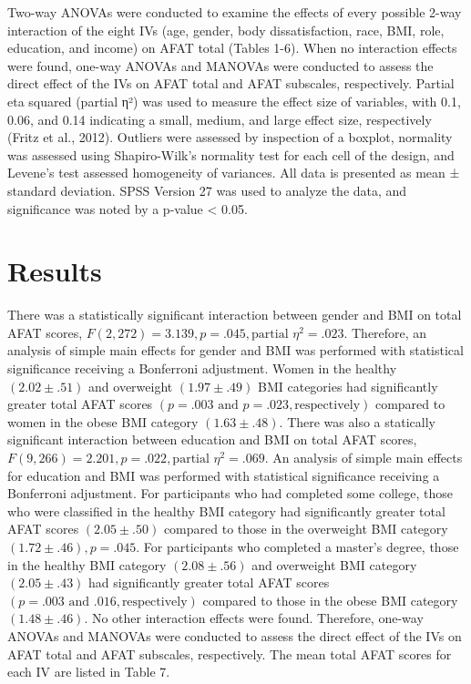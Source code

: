\documentclass[
  jou,
  longtable,
  nolmodern,
  notxfonts,
  notimes,
  colorlinks=true,linkcolor=blue,citecolor=blue,urlcolor=blue]{apa7}
\begin{document}
Two-way ANOVAs were conducted to examine the effects of every possible
2-way interaction of the eight IVs (age, gender, body dissatisfaction,
race, BMI, role, education, and income) on AFAT total (Tables 1-6). When
no interaction effects were found, one-way ANOVAs and MANOVAs were
conducted to assess the direct effect of the IVs on AFAT total and AFAT
subscales, respectively. Partial eta squared (partial η²) was used to
measure the effect size of variables, with 0.1, 0.06, and 0.14
indicating a small, medium, and large effect size, respectively (Fritz
et al., 2012). Outliers were assessed by inspection of a boxplot,
normality was assessed using Shapiro-Wilk's normality test for each cell
of the design, and Levene's test assessed homogeneity of variances. All
data is presented as mean ± standard deviation. SPSS Version 27 was used
to analyze the data, and significance was noted by a p-value \textless{}
0.05.

\section{Results}\label{results}

There was a statistically significant interaction between gender and BMI
on total AFAT scores,
\(F(2,272) = 3.139, p = .045, \text{partial } \eta^2 = .023\).
Therefore, an analysis of simple main effects for gender and BMI was
performed with statistical significance receiving a Bonferroni
adjustment. Women in the healthy \((2.02 \pm .51)\) and overweight
\((1.97 \pm .49)\) BMI categories had significantly greater total AFAT
scores \((p = .003 \text{ and } p = .023, \text{respectively})\)
compared to women in the obese BMI category \((1.63 \pm .48)\). There
was also a statically significant interaction between education and BMI
on total AFAT scores,
\(F(9,266) = 2.201, p = .022, \text{partial } \eta^2 = .069\). An
analysis of simple main effects for education and BMI was performed with
statistical significance receiving a Bonferroni adjustment. For
participants who had completed some college, those who were classified
in the healthy BMI category had significantly greater total AFAT scores
\((2.05 \pm .50)\) compared to those in the overweight BMI category
\((1.72 \pm .46), p = .045\). For participants who completed a master's
degree, those in the healthy BMI category \((2.08 \pm .56)\) and
overweight BMI category \((2.05 \pm .43)\) had significantly greater
total AFAT scores \((p = .003 \text{ and } .016, \text{respectively})\)
compared to those in the obese BMI category \((1.48 \pm .46)\). No other
interaction effects were found. Therefore, one-way ANOVAs and MANOVAs
were conducted to assess the direct effect of the IVs on AFAT total and
AFAT subscales, respectively. The mean total AFAT scores for each IV are
listed in Table 7.
\end{document}
